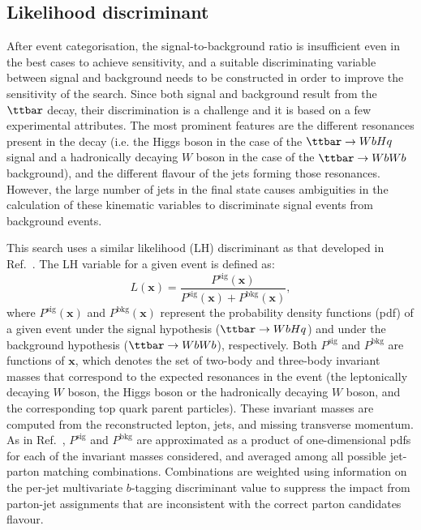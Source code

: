 \subsection{Likelihood discriminant}
\label{sec:likelihood_discriminant}

After event categorisation, the signal-to-background ratio is insufficient even in the best cases to achieve sensitivity, and a suitable
discriminating variable between signal and background needs to be constructed in order to improve the sensitivity of the search.
Since both signal and background result from the $\ttbar$ decay, 
their discrimination is a challenge and it is based on a few experimental attributes.  
The most prominent features are the different resonances present in the decay (i.e. the Higgs boson in the case 
of the $\Hq$ signal and a hadronically decaying $W$ boson in the case of the $\ttbar \to WbWb$ background), and the different flavour of the 
jets forming those resonances. However, the large number of jets in the final state causes ambiguities in the calculation 
of these kinematic variables to discriminate signal events from background events. 

This search uses a similar likelihood (LH) discriminant as that developed in Ref.~\cite{Aad:2015pja}.
The LH variable for a given event is defined as:
\begin{equation}
L(\mathbf{x}) = \frac{P^\textrm{sig}(\mathbf{x}) }{P^\textrm{sig}(\mathbf{x}) +P^\textrm{bkg}(\mathbf{x}) },
\label{eq:D}
\end{equation}
where $P^\textrm{sig}(\mathbf{x}) $ and $P^\textrm{bkg}(\mathbf{x}) $ represent the probability density functions (pdf) of a given event under
the signal hypothesis ($\ttbar \to WbHq$) and under the background hypothesis ($\ttbar \to WbWb$), respectively.
Both $P^\textrm{sig}$ and $P^\textrm{bkg}$ are functions of $\mathbf{x}$, which denotes the set of two-body and three-body invariant masses 
that correspond to the expected resonances in the event (the leptonically decaying $W$ boson, the Higgs boson or the hadronically 
decaying $W$ boson, and the corresponding top quark parent particles). These invariant masses are computed from the reconstructed 
lepton, jets, and missing transverse momentum.
As in Ref.~\cite{Aad:2015pja}, $P^\textrm{sig}$ and $P^\textrm{bkg}$ are approximated as a product of one-dimensional pdfs for
each of the invariant masses considered, and averaged among all possible jet-parton matching combinations. 
Combinations are weighted using information on the per-jet multivariate $b$-tagging discriminant value to suppress the impact from 
parton-jet assignments that are inconsistent with the correct parton candidates flavour.

